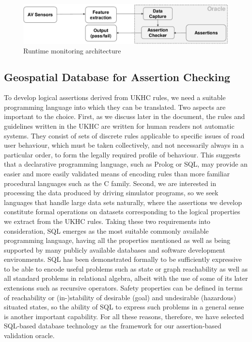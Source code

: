  
\begin{figure}[h!]
    \centering
    \includegraphics[width=0.98\linewidth]{../other/figures/RuntimeAssertionsTestBenchArchitectureV6.pdf}
    \caption{Runtime monitoring architecture}
    \label{fig:RuntimeArchitecture}
\end{figure}


\subsection{Geospatial Database for Assertion Checking} \label{geospatial_database}
To develop logical assertions derived from UKHC rules, we need a suitable programming language into which they can be translated. Two aspects are important to the choice. First, as we discuss later in the document, the rules and guidelines written in the UKHC are written for human readers not automatic systems. They consist of sets of discrete rules applicable to specific issues of road user behaviour, which must be taken collectively, and not necessarily always in a particular order, to form the legally required profile of behaviour. This suggests that a declarative programming language, such as Prolog or SQL, may provide an easier and more easily validated means of encoding rules than more familiar procedural languages such as the C family. Second, we are interested in processing the data produced by driving simulator programs, so we seek languages that handle large data sets naturally, where the assertions we develop constitute formal operations on datasets corresponding to the logical properties we extract from the UKHC rules. Taking these two requirements into consideration, SQL emerges as the most suitable commonly available programming language, having all the properties mentioned as well as being supported by many publicly available databases and software development environments. SQL has been demonstrated formally \cite{sqllibkin} to be sufficiently expressive to be able to encode useful problems such as state or graph reachability as well as all standard problems in relational algebra, albeit with the use of some of its later extensions such as recursive operators. Safety properties can be defined in terms of reachability \cite{guiochet2015, masson2019} or (in-)stability \cite{harper2005, xue2020} of desirable (goal) and undesirable (hazardous) situated states, so the ability of SQL to express such problems in a general sense is another important capability. For all these reasons, therefore, we have selected SQL-based database technology as the framework for our assertion-based validation oracle. 

